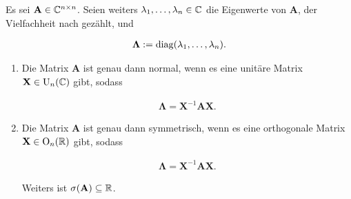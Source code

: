             \begin{theorem} \label{thm:spectral_theorem}

                Es sei $\mathbf A \in \mathbb C^{n \times n}$.
                Seien weiters $\lambda_1, \dots, \lambda_n \in \mathbb C$ die Eigenwerte von $\mathbf A$, der Vielfachheit nach gezählt, und

                \begin{align*}
                    \mathbf \Lambda
                    :=
                    \operatorname{diag}(\lambda_1, \dots, \lambda_n).
                \end{align*}

                \begin{enumerate}[
                    label = \texttt{ad} \arabic*.,
                    wide,
                    labelindent = 0pt
                ]

                    \item Die Matrix $\mathbf A$ ist genau dann normal, wenn es eine unitäre Matrix $\mathbf X \in \operatorname U_n(\mathbb C)$ gibt, sodass

                    \begin{align*}
                        \mathbf \Lambda
                        =
                        \mathbf X^{-1} \mathbf A \mathbf X.
                    \end{align*}

                    \item Die Matrix $\mathbf A$ ist genau dann symmetrisch, wenn es eine orthogonale Matrix $\mathbf X \in \operatorname O_n(\mathbb R)$ gibt, sodass

                    \begin{align*}
                        \mathbf \Lambda
                        =
                        \mathbf X^{-1} \mathbf A \mathbf X.
                    \end{align*}                    
                    
                    Weiters ist $\sigma(\mathbf A) \subseteq \mathbb R$.

                \end{enumerate}

            \end{theorem}

